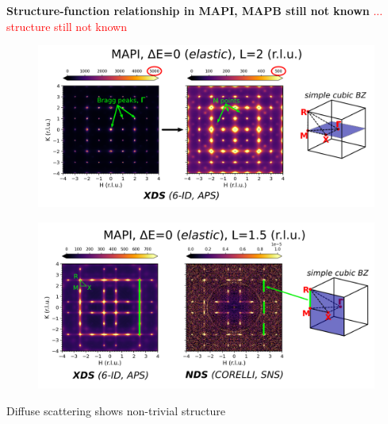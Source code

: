 \documentclass[12pt]{beamer}
\begin{document}
\begin{frame} %

\textbf{Structure-function relationship in MAPI, MAPB still not known}\textcolor{red}{ ... structure still not known}

\vspace{1cm}
\begin{figure}
    \includegraphics[width=1.0\linewidth]{figs/bragg.png}
\end{figure}

\end{frame}


\begin{frame} %

\begin{figure}
    \includegraphics[width=1.0\linewidth]{figs/zb.png}
\end{figure}

\vspace{0.5cm}
Diffuse scattering shows non-trivial structure 

\end{frame}
\end{document}
